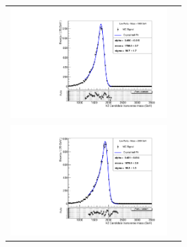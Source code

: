 \begin{figure}[!ht]
\begin{tabular}{cc}
  \includegraphics[width=170pt]{figuresARC/fits/BulkGravLP1800.pdf} \\
  \includegraphics[width=170pt]{figuresARC/fits/BulkGravLP2000.pdf} \\
\end{tabular}
\label{fig:fits6b}
\end{figure}


